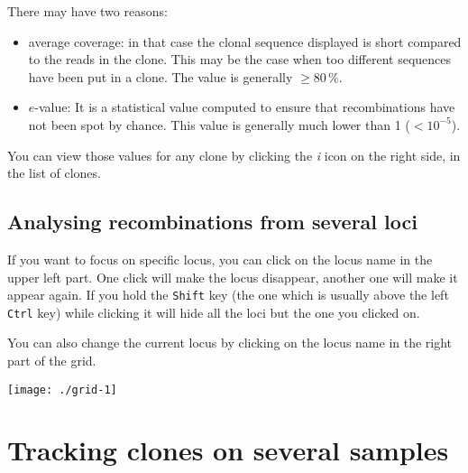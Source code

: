 \documentclass[10pt]{article}
\begin{document}
There may have two reasons: 
\begin{itemize}
\item average coverage: in that case the clonal sequence displayed is short
  compared to the reads in the clone. This may be the case when too different
  sequences have been put in a clone. The value is generally $\geq 80\,\%$.
\item $e$-value: It is a statistical value computed to ensure that
  recombinations have not been spot by chance. This value is generally much
  lower than 1 ($<10^{-5}$).
\end{itemize}

You can view those values for any clone by clicking the \textit{i} icon on the
right side, in the list of clones.
\subsection{Analysing recombinations from several loci}

If you want to focus on specific locus, you can click on the locus name in
the upper left part. One click will make the locus disappear, another one will
make it appear again.
If you hold the \texttt{Shift} key (the one which is usually above the left
\texttt{Ctrl} key) while clicking it will hide all the loci but the one you
clicked on.




You can also change the current locus by clicking on the locus name in the
right part of the grid.



\bigskip

\bigskip

\centerline{\texttt{[image: ./grid-1]}}

\newpage



\section{Tracking clones on several samples}
\end{document}
